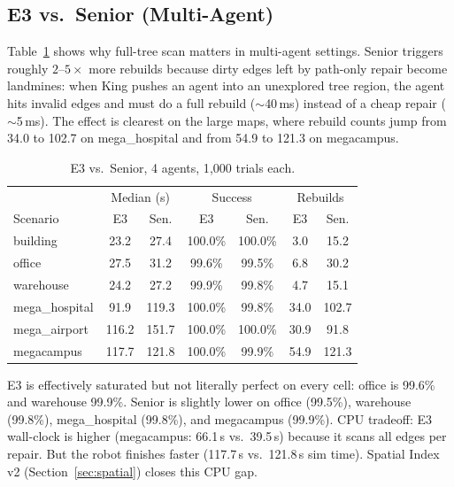 \documentclass[letterpaper, 10pt, conference]{IEEEtran}
\begin{document}
\subsection{E3 vs.\ Senior (Multi-Agent)}

Table~\ref{tab:e3_senior} shows why full-tree scan matters in multi-agent settings. Senior triggers roughly $2$--$5\times$ more rebuilds because dirty edges left by path-only repair become landmines: when King pushes an agent into an unexplored tree region, the agent hits invalid edges and must do a full rebuild (${\sim}$40\,ms) instead of a cheap repair (${\sim}$5\,ms). The effect is clearest on the large maps, where rebuild counts jump from 34.0 to 102.7 on mega\_hospital and from 54.9 to 121.3 on megacampus.

\begin{table}[t]
\centering
\caption{E3 vs.\ Senior, 4 agents, 1{,}000 trials each.}
\label{tab:e3_senior}
\begin{tabular}{l cc cc cc}
\toprule
 & \multicolumn{2}{c}{Median (s)} & \multicolumn{2}{c}{Success} & \multicolumn{2}{c}{Rebuilds} \\
Scenario & E3 & Sen. & E3 & Sen. & E3 & Sen. \\
\midrule
building       & 23.2 &  27.4 & 100.0\% & 100.0\% &   3.0 &  15.2 \\
office         & 27.5 &  31.2 &  99.6\% &  99.5\% &   6.8 &  30.2 \\
warehouse      & 24.2 &  27.2 &  99.9\% &  99.8\% &   4.7 &  15.1 \\
mega\_hospital & 91.9 & 119.3 & 100.0\% &  99.8\% &  34.0 & 102.7 \\
mega\_airport  & 116.2 & 151.7 & 100.0\% & 100.0\% & 30.9 &  91.8 \\
megacampus     & 117.7 & 121.8 & 100.0\% &  99.9\% &  54.9 & 121.3 \\
\bottomrule
\end{tabular}

\vspace{1mm}
\begin{minipage}{\columnwidth}
\footnotesize
E3 is effectively saturated but not literally perfect on every cell: office is 99.6\% and warehouse 99.9\%. Senior is slightly lower on office (99.5\%), warehouse (99.8\%), mega\_hospital (99.8\%), and megacampus (99.9\%). CPU tradeoff: E3 wall-clock is higher (megacampus: 66.1\,s vs.\ 39.5\,s) because it scans all edges per repair. But the robot finishes faster (117.7\,s vs.\ 121.8\,s sim time). Spatial Index v2 (Section~\ref{sec:spatial}) closes this CPU gap.
\end{minipage}
\end{table}
\end{document}
